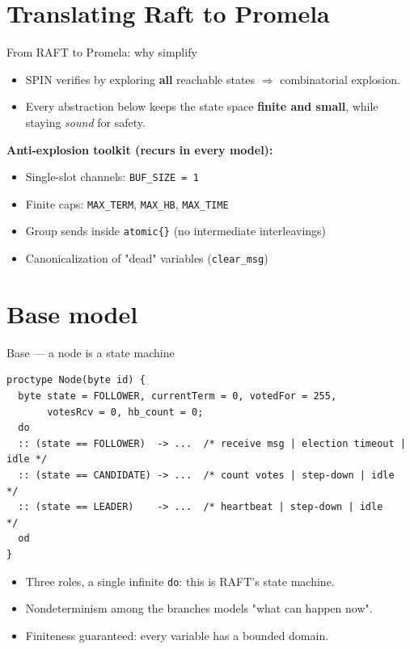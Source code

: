 \documentclass{beamer}
\begin{document}
\section{Translating Raft to Promela}
\begin{frame}{From RAFT to Promela: why simplify}
  \begin{itemize}
    \item SPIN verifies by exploring \textbf{all} reachable states
          $\Rightarrow$ combinatorial explosion.
    \item Every abstraction below keeps the state space
          \textbf{finite and small}, while staying \emph{sound} for safety.
  \end{itemize}
  \vfill
  \textbf{Anti-explosion toolkit (recurs in every model):}
  \begin{itemize}
    \item Single-slot channels: \texttt{BUF\_SIZE = 1}
    \item Finite caps: \texttt{MAX\_TERM}, \texttt{MAX\_HB}, \texttt{MAX\_TIME}
    \item Group sends inside \texttt{atomic\{\}} (no intermediate interleavings)
    \item Canonicalization of "dead" variables (\texttt{clear\_msg})
  \end{itemize}
\end{frame}

\section{Base model}

\begin{frame}[fragile]{Base — a node is a state machine}
\begin{lstlisting}[style=promela]
proctype Node(byte id) {
  byte state = FOLLOWER, currentTerm = 0, votedFor = 255,
       votesRcv = 0, hb_count = 0;
  do
  :: (state == FOLLOWER)  -> ...  /* receive msg | election timeout | idle */
  :: (state == CANDIDATE) -> ...  /* count votes | step-down | idle        */
  :: (state == LEADER)    -> ...  /* heartbeat | step-down | idle          */
  od
}
\end{lstlisting}
  \begin{itemize}
    \item Three roles, a single infinite \texttt{do}: this is RAFT's state machine.
    \item Nondeterminism among the branches models "what can happen now".
    \item Finiteness guaranteed: every variable has a bounded domain.
  \end{itemize}
\end{frame}
\end{document}

